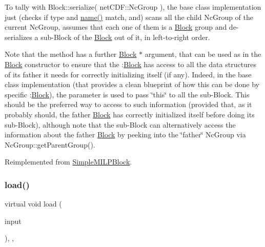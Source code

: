 To tally with Block\+::serialize( net\+C\+D\+F\+::\+Nc\+Group ), the base class implementation just (checks if type and \mbox{\hyperlink{class_s_m_spp__di__unipi__it_1_1_block_a738e9dfd6e00507da219e4bd5a3f6be9}{name()}} match, and) scans all the child Nc\+Group of the current Nc\+Group, assumes that each one of them is a \mbox{\hyperlink{class_s_m_spp__di__unipi__it_1_1_block}{Block}} group and de-\/serializes a sub-\/\+Block of the \mbox{\hyperlink{class_s_m_spp__di__unipi__it_1_1_block}{Block}} out of it, in left-\/to-\/right order.

Note that the method has a further \mbox{\hyperlink{class_s_m_spp__di__unipi__it_1_1_block}{Block}} $\ast$ argument, that can be used as in the \mbox{\hyperlink{class_s_m_spp__di__unipi__it_1_1_block}{Block}} constructor to ensure that the \+:\mbox{\hyperlink{class_s_m_spp__di__unipi__it_1_1_block}{Block}} has access to all the data structures of its father it needs for correctly initializing itself (if any). Indeed, in the base class implementation (that provides a clean blueprint of how this can be done by specific \+:\mbox{\hyperlink{class_s_m_spp__di__unipi__it_1_1_block}{Block}}), the parameter is used to pass \char`\"{}this\char`\"{} to all the sub-\/\+Block. This should be the preferred way to access to such information (provided that, as it probably should, the father \mbox{\hyperlink{class_s_m_spp__di__unipi__it_1_1_block}{Block}} has correctly initialized itself before doing its sub-\/\+Block), although note that the sub-\/\+Block can alternatively access the information about the father \mbox{\hyperlink{class_s_m_spp__di__unipi__it_1_1_block}{Block}} by peeking into the \char`\"{}father\char`\"{} Nc\+Group via Nc\+Group\+::get\+Parent\+Group(). 

Reimplemented from \mbox{\hyperlink{class_s_m_spp__di__unipi__it_1_1_simple_m_i_l_p_block_a817e3ce47ea40c14517ec16c6b62b814}{Simple\+M\+I\+L\+P\+Block}}.

\mbox{\label{class_s_m_spp__di__unipi__it_1_1_structured_m_i_l_p_block_a019850055afe817b816bae5699f461d3}} 
\subsubsection{\texorpdfstring{load()}{load()}}
{\footnotesize\ttfamily virtual void load (\begin{DoxyParamCaption}\item[{std\+::istream \&}]{input }\end{DoxyParamCaption})\hspace{0.3cm}{\ttfamily [override]}, {\ttfamily [protected]}, {\ttfamily [virtual]}}




